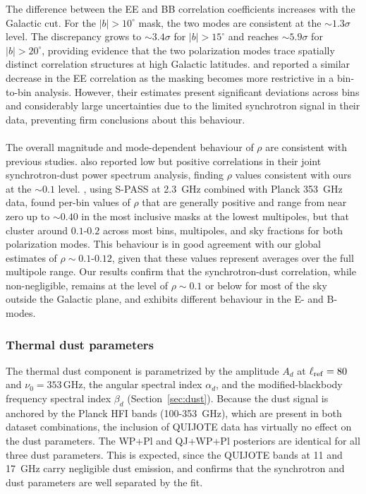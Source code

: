 The difference between the EE and BB correlation coefficients increases with the Galactic cut. For the $|b| > 10^\circ$ mask, the two modes are consistent at the $\sim 1.3\sigma$ level. The discrepancy grows to $\sim 3.4\sigma$ for $|b| > 15^\circ$ and reaches $\sim 5.9\sigma$ for $|b| > 20^\circ$, providing evidence that the two polarization modes trace spatially distinct correlation structures at high Galactic latitudes. \citet{Choi_2015} and \cite{Planck_2018XI} reported a similar decrease in the EE correlation as the masking becomes more restrictive in a bin-to-bin analysis. However, their estimates present significant deviations across bins and considerably large uncertainties due to the limited synchrotron signal in their data, preventing firm conclusions about this behaviour.

\paragraph{}

The overall magnitude and mode-dependent behaviour of $\rho$ are consistent with previous studies. \citet{Planck_2018XI} also reported low but positive correlations in their joint synchrotron-dust power spectrum analysis, finding $\rho$ values consistent with ours at the $\sim 0.1$ level. \citet{Krachmalnicoff_2018}, using S-PASS at 2.3~GHz combined with Planck 353~GHz data, found per-bin values of $\rho$ that are generally positive and range from near zero up to $\sim 0.40$ in the most inclusive masks at the lowest multipoles, but that cluster around $0.1$-$0.2$ across most bins, multipoles, and sky fractions for both polarization modes. This behaviour is in good agreement with our global estimates of $\rho \sim 0.1$-$0.12$, given that these values represent averages over the full multipole range. Our results confirm that the synchrotron-dust correlation, while non-negligible, remains at the level of $\rho \sim 0.1$ or below for most of the sky outside the Galactic plane, and exhibits different behaviour in the E- and B-modes.

\subsubsection{Thermal dust parameters}
\label{sec:dust_pl}

The thermal dust component is parametrized by the amplitude $A_d$ at $\ell_{\rm ref} = 80$ and $\nu_0 = 353\,\mathrm{GHz}$, the angular spectral index $\alpha_d$, and the modified-blackbody frequency spectral index $\beta_d$ (Section~\ref{sec:dust}). Because the dust signal is anchored by the Planck HFI bands (100-353~GHz), which are present in both dataset combinations, the inclusion of QUIJOTE data has virtually no effect on the dust parameters. The WP+Pl and QJ+WP+Pl posteriors are identical for all three dust parameters. This is expected, since the QUIJOTE bands at 11 and 17~GHz carry negligible dust emission, and confirms that the synchrotron and dust parameters are well separated by the fit.

